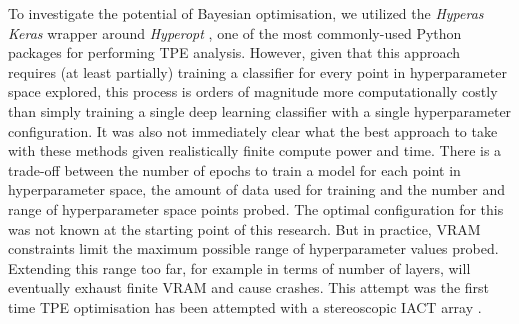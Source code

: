 To investigate the potential of Bayesian optimisation, we utilized the \textit{Hyperas} \cite{hyperas} \textit{Keras} wrapper around \textit{Hyperopt} \cite{hyperopt}, one of the most commonly-used Python packages for performing TPE analysis. However, given that this approach requires (at least partially) training a classifier for every point in hyperparameter space explored, this process is orders of magnitude more computationally costly than simply training a single deep learning classifier with a single hyperparameter configuration. It was also not immediately clear what the best approach to take with these methods given realistically finite compute power and time. There is a trade-off between the number of epochs to train a model for each point in hyperparameter space, the amount of data used for training and the number and range of hyperparameter space points probed. The optimal configuration for this was not known at the starting point of this research. But in practice, VRAM constraints limit the maximum possible range of hyperparameter values probed. Extending this range too far, for example in terms of number of layers, will eventually exhaust finite VRAM and cause crashes. This attempt was the first time TPE optimisation has been attempted with a stereoscopic IACT array \cite{nietopc}.

